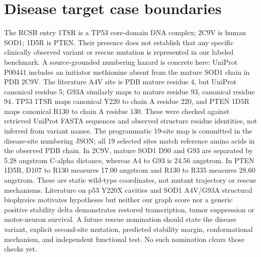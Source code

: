 \documentclass[11pt]{article}
\newcommand{\href}[2]{#2}
\begin{document}
\section{Disease target case boundaries}
The RCSB entry \href{https://www.rcsb.org/structure/1TSR}{1TSR} is a TP53 core-domain DNA complex; \href{https://www.rcsb.org/structure/2C9V}{2C9V} is human SOD1; \href{https://www.rcsb.org/structure/1D5R}{1D5R} is PTEN. Their presence does not establish that any specific clinically observed variant or rescue mutation is represented in our labeled benchmark. A source-grounded numbering hazard is concrete here: UniProt P00441 includes an initiator methionine absent from the mature SOD1 chain in PDB 2C9V. The literature A4V site is PDB mature residue 4, but UniProt canonical residue 5; G93A similarly maps to mature residue 93, canonical residue 94. TP53 1TSR maps canonical Y220 to chain A residue 220, and PTEN 1D5R maps canonical R130 to chain A residue 130. These were checked against retrieved UniProt FASTA sequences and observed structure residue identities, not inferred from variant names. The programmatic 19-site map is committed in the disease-site numbering JSON; all 19 selected sites match reference amino acids in the observed PDB chain. In 2C9V, mature SOD1 D90 and G93 are separated by 5.28 angstrom C-alpha distance, whereas A4 to G93 is 24.56 angstrom. In PTEN 1D5R, D107 to R130 measures 17.00 angstrom and R130 to R335 measures 28.60 angstrom. These are static wild-type coordinates, not mutant trajectory or rescue mechanisms. Literature on p53 Y220X cavities and SOD1 A4V/G93A structural biophysics motivates hypotheses but neither our graph score nor a generic positive stability delta demonstrates restored transcription, tumor suppression or motor-neuron survival. A future rescue nomination should state the disease variant, explicit second-site mutation, predicted stability margin, conformational mechanism, and independent functional test. No such nomination clears those checks yet.
\end{document}
